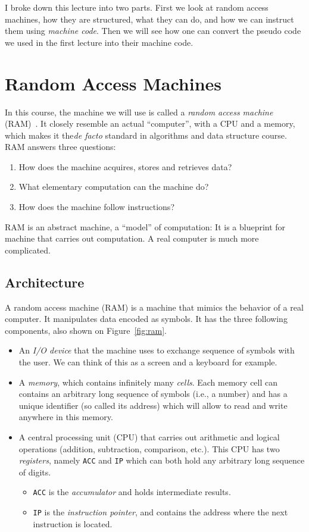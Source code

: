 \documentclass {aldast}
\begin{document}
I broke down this lecture into two parts. First we look at random
access machines, how they are structured, what they can do, and how we
can instruct them using \emph{machine code}. Then we will see how one
can convert the pseudo code we used in the first lecture into their
machine code.

\section{Random Access Machines}
In this course, the machine we will use is called a \emph{random
  access machine} (RAM)~\cite{cook1973}. It closely resemble an actual
``computer'', with a CPU and a memory, which makes it the\emph{de
  facto} standard in algorithms and data structure course. RAM answers
three questions:
\begin{enumerate}
\item How does the machine acquires, stores and retrieves data?
\item What elementary computation can the machine do?
\item How does the machine follow instructions?
\end{enumerate}

RAM is an abstract machine, a ``model'' of computation: It is a
blueprint for machine that carries out computation. A real computer is
much more complicated.

\subsection{Architecture}

A random access machine (RAM) is a machine that mimics the behavior of
a real computer. It manipulates data encoded as symbols. It has the three
following components, also shown on Figure~\ref{fig:ram}.
\begin{itemize}
\item An \emph{I/O device} that the machine uses to exchange sequence
  of symbols with the user. We can think of this as a screen and a
  keyboard for example.
\item A \emph{memory}, which contains infinitely many
  \emph{cells}. Each memory cell can contains an arbitrary long
  sequence of symbols (i.e., a number) and has a unique identifier (so
  called its address) which will allow to read and write anywhere in
  this memory.
\item A central processing unit (CPU) that carries out arithmetic and
  logical operations (addition, subtraction, comparison, etc.). This CPU
  has two \emph{registers}, namely \texttt{ACC} and \texttt{IP} which
  can both hold any arbitrary long sequence of digits.
  \begin{itemize}
  \item \texttt{ACC} is the \emph{accumulator} and holds
    intermediate results.
  \item \texttt{IP} is the \emph{instruction pointer}, and contains the
    address where the next instruction is located.
  \end{itemize}
\end{itemize}
\end{document}
